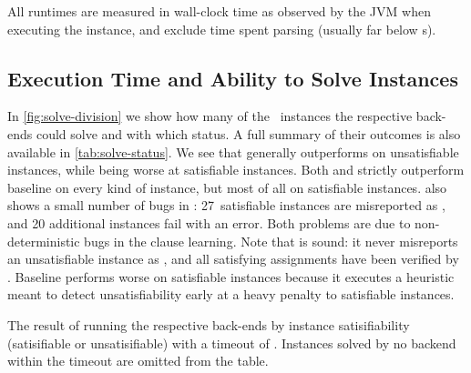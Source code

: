 \documentclass[acmsmall,review,anonymous,screen]{acmart}\settopmatter{printfolios=true,printccs=true,printacmref=true}
\theoremstyle{definition}
\begin{document}
All runtimes are measured in wall-clock time as observed by the JVM when
executing the instance, and exclude time spent parsing (usually far below
s).

\subsection{Execution Time and Ability to Solve Instances}\label{sec:runtime}

In \cref{fig:solve-division} we show how many of the~\NrBenchmarks{} instances
the respective back-ends could solve and with which status. A full summary of
their outcomes is also available in \cref{tab:solve-status}. We see that
\Calculus{} generally outperforms \Nuxmv{} on unsatisfiable instances, while
being worse at satisfiable instances. Both \Nuxmv{} and \Calculus{} strictly
outperform baseline on every kind of instance, but most of all on satisfiable
instances.  also shows a small number of bugs in
\Calculus{}: 27~satisfiable instances are misreported as \Unsat{}, and 20
additional instances fail with an error. Both problems are due to
non-deterministic bugs in the clause learning. Note that \Calculus{} is sound:
it never misreports an unsatisfiable instance as \Sat{}, and all
 satisfying assignments have been verified by \Nuxmv{}.
Baseline performs worse on satisfiable instances because it executes a heuristic
meant to detect unsatisfiability early at a heavy penalty to satisfiable
instances.

\begin{table}
  \centering
  
  \caption{The result of running the respective back-ends by instance
  satisifiability (satisifiable or unsatisifiable) with a timeout of
  \RuntimeTimeout. Instances solved by no backend within the timeout are omitted
  from the table. }\label{tab:solve-status}
\end{table}
\end{document}
